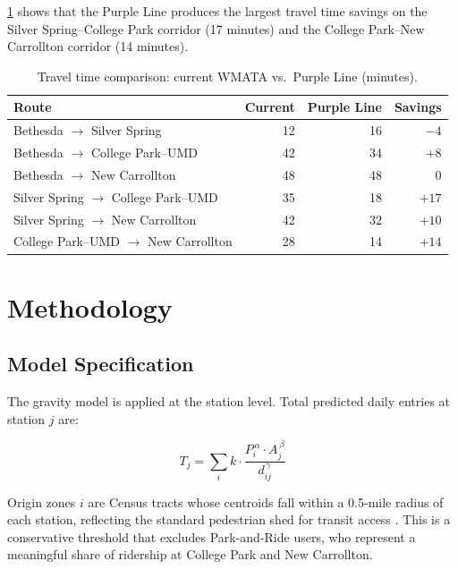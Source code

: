 \documentclass[11pt]{article}
\begin{document}
\cref{tab:traveltimes} shows that the Purple Line produces the largest
travel time savings on the Silver Spring--College Park corridor (17 minutes)
and the College Park--New Carrollton corridor (14 minutes).

\begin{table}[H]
    \centering
    \caption{Travel time comparison: current WMATA vs.\ Purple Line (minutes).}
    \label{tab:traveltimes}
    \begin{tabular}{lrrr}
        \toprule
        Route & Current & Purple Line & Savings \\
        \midrule
        Bethesda $\to$ Silver Spring     & 12 & 16 & $-4$ \\
        Bethesda $\to$ College Park--UMD & 42 & 34 & $+8$ \\
        Bethesda $\to$ New Carrollton    & 48 & 48 & $0$  \\
        Silver Spring $\to$ College Park--UMD & 35 & 18 & $+17$ \\
        Silver Spring $\to$ New Carrollton    & 42 & 32 & $+10$ \\
        College Park--UMD $\to$ New Carrollton & 28 & 14 & $+14$ \\
        \bottomrule
    \end{tabular}
\end{table}

\section{Methodology}
\label{sec:methods}

\subsection{Model Specification}

The gravity model is applied at the station level. Total predicted daily
entries at station $j$ are:

\begin{equation}
    T_j = \sum_{i} k \cdot
          \frac{P_i^{\,\alpha} \cdot A_j^{\,\beta}}{d_{ij}^{\,\gamma}}
    \label{eq:station_total}
\end{equation}

Origin zones $i$ are Census tracts whose centroids fall within a 0.5-mile
radius of each station, reflecting the standard pedestrian shed for transit
access \citep{cardozo2012}. This is a conservative threshold that excludes
Park-and-Ride users, who represent a meaningful share of ridership at
College Park and New Carrollton.
\end{document}
